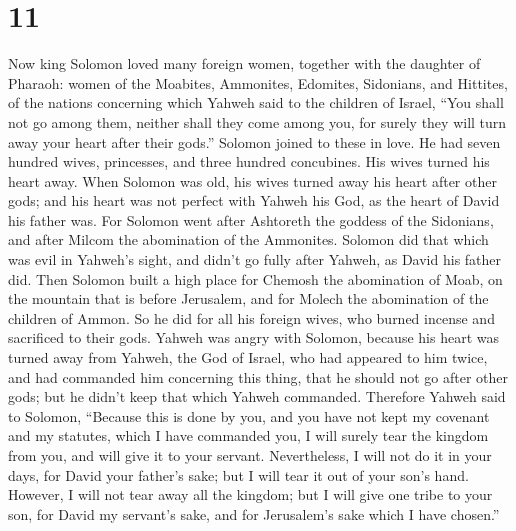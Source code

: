 \hypertarget{section-10}{%
\section{11}\label{section-10}}

 Now king Solomon loved many foreign women, together with
the daughter of Pharaoh: women of the Moabites, Ammonites, Edomites,
Sidonians, and Hittites,  of the nations concerning which
Yahweh said to the children of Israel, ``You shall not go among them,
neither shall they come among you, for surely they will turn away your
heart after their gods.'' Solomon joined to these in love. 
He had seven hundred wives, princesses, and three hundred concubines.
His wives turned his heart away.  When Solomon was old, his
wives turned away his heart after other gods; and his heart was not
perfect with Yahweh his God, as the heart of David his father was.
 For Solomon went after Ashtoreth the goddess of the
Sidonians, and after Milcom the abomination of the Ammonites.
 Solomon did that which was evil in Yahweh's sight, and
didn't go fully after Yahweh, as David his father did.  Then
Solomon built a high place for Chemosh the abomination of Moab, on the
mountain that is before Jerusalem, and for Molech the abomination of the
children of Ammon.  So he did for all his foreign wives, who
burned incense and sacrificed to their gods.  Yahweh was
angry with Solomon, because his heart was turned away from Yahweh, the
God of Israel, who had appeared to him twice,  and had
commanded him concerning this thing, that he should not go after other
gods; but he didn't keep that which Yahweh commanded. 
Therefore Yahweh said to Solomon, ``Because this is done by you, and you
have not kept my covenant and my statutes, which I have commanded you, I
will surely tear the kingdom from you, and will give it to your servant.
 Nevertheless, I will not do it in your days, for David
your father's sake; but I will tear it out of your son's hand.
 However, I will not tear away all the kingdom; but I will
give one tribe to your son, for David my servant's sake, and for
Jerusalem's sake which I have chosen.''

